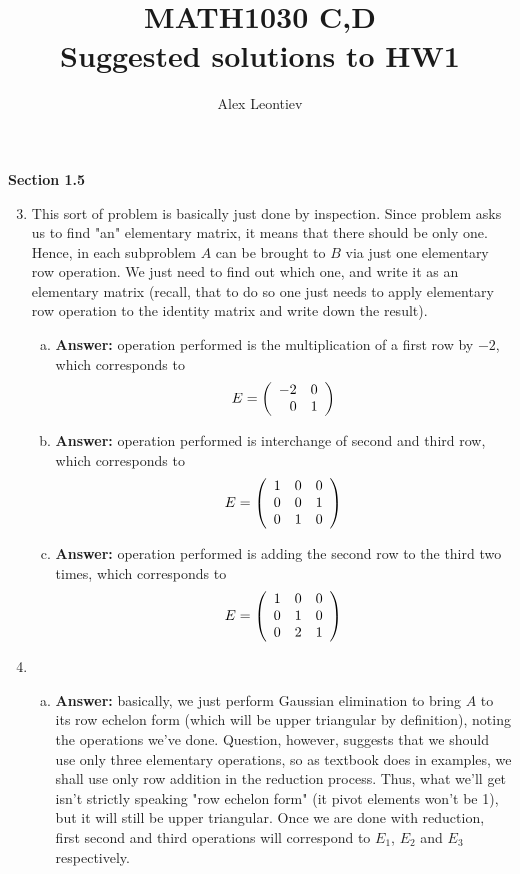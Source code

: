 \documentclass[8pt]{article} %
\title{MATH1030 C,D\\Suggested solutions to HW1}
\author{Alex Leontiev}
\begin{document}
\maketitle
	\renewcommand{\v}{\mathbf{v}}
	\renewcommand{\u}{\mathbf{u}}
	\renewcommand{\i}{\mathbf{i}}
	\renewcommand{\j}{\mathbf{j}}
	\renewcommand{\k}{\mathbf{k}}
	\newcommand{\w}{\mathbf{w}}
\textbf{Section 1.5}
\begin{enumerate}[1]
	\setcounter{enumi}{2}
	\item This sort of problem is basically just done by inspection. Since problem asks us to find "an" elementary matrix,
		it means that there should be only one. Hence, in each subproblem $A$ can be brought to $B$ via just one elementary
		row operation. We just need to find out which one, and write it as an elementary matrix (recall, that to do so
		one just needs to apply elementary row operation to the identity matrix and write down the result).
		\begin{enumerate}[(a)]
			\item {\bf Answer: }operation performed is the multiplication of a first row by $-2$, which corresponds to
				\[E=\left(\begin{array}{rr}-2&0\\0&1\end{array}\right)\]
			\item {\bf Answer: }operation performed is interchange of second and third row, which corresponds to
				\[E=\left(\begin{array}{lll}1&0&0\\0&0&1\\0&1&0\end{array}\right)\]
			\item {\bf Answer: }operation performed is adding the second row to the third two times, which corresponds to
				\[E=\left(\begin{array}{lll}1&0&0\\0&1&0\\0&2&1\end{array}\right)\]
		\end{enumerate}
	\setcounter{enumi}{5}
	\item
		\begin{enumerate}[(a)]
			\item {\bf Answer: }basically, we just perform Gaussian elimination to bring $A$ to its row echelon form
				(which will be upper triangular by definition), noting the operations we've done. Question, however,
				suggests that we should use only three elementary operations, so as textbook does in examples, we
				shall use only row addition in the reduction process. Thus, what we'll get isn't strictly speaking
				"row echelon form" (it pivot elements won't be 1), but it will still be upper triangular. Once
				we are done with reduction, first second and third operations will correspond to $E_1$, $E_2$ and $E_3
				$ respectively.
				

\end{enumerate}
\end{enumerate}
\end{document}
